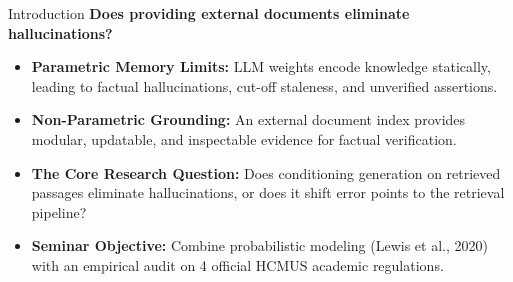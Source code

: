 \begin{frame}{Introduction}
  \vspace{0.1cm}
  {\Large\textbf{Does providing external documents eliminate hallucinations?}}
  \vspace{0.4cm}

  \begin{itemize}
    \setlength{\itemsep}{0.25cm}
    \item \textbf{Parametric Memory Limits:} LLM weights encode knowledge statically, leading to factual hallucinations, cut-off staleness, and unverified assertions.
    \item \textbf{Non-Parametric Grounding:} An external document index provides modular, updatable, and inspectable evidence for factual verification.
    \item \textbf{The Core Research Question:} Does conditioning generation on retrieved passages eliminate hallucinations, or does it shift error points to the retrieval pipeline?
    \item \textbf{Seminar Objective:} Combine probabilistic modeling (Lewis et al., 2020) with an empirical audit on 4 official HCMUS academic regulations.
  \end{itemize}

\end{frame}
